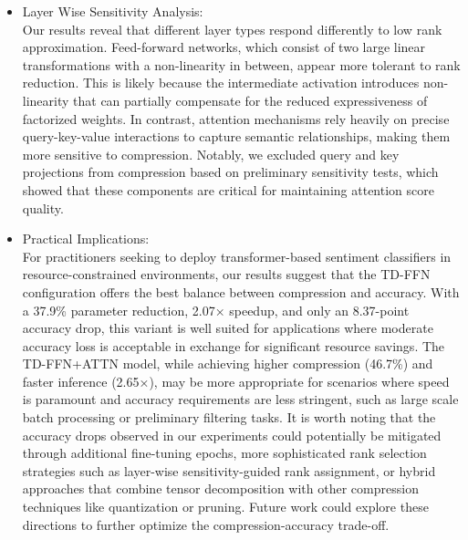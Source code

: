 \documentclass[conference]{IEEEtran}
\begin{document}
\begin{itemize}
            value and output projections, are more sensitive to rank reduction than feed-forward layers, which aligns with
            findings from prior work on transformer compression.
    \item Layer Wise Sensitivity Analysis:\\
            Our results reveal that different layer types respond differently to low rank approximation. Feed-forward networks,
            which consist of two large linear transformations with a non-linearity in between, appear more tolerant to rank
            reduction. This is likely because the intermediate activation introduces non-linearity that can partially compensate
            for the reduced expressiveness of factorized weights. In contrast, attention mechanisms rely heavily on precise
            query-key-value interactions to capture semantic relationships, making them more sensitive to compression.
            Notably, we excluded query and key projections from compression based on preliminary sensitivity tests, which
            showed that these components are critical for maintaining attention score quality.
    \item Practical Implications:\\
            For practitioners seeking to deploy transformer-based sentiment classifiers in resource-constrained environments,
            our results suggest that the TD-FFN configuration offers the best balance between compression and accuracy.
            With a 37.9\% parameter reduction, 2.07× speedup, and only an 8.37-point accuracy drop, this variant is well suited
            for applications where moderate accuracy loss is acceptable in exchange for significant resource savings.
            The TD-FFN+ATTN model, while achieving higher compression (46.7\%) and faster inference (2.65×), may be more
            appropriate for scenarios where speed is paramount and accuracy requirements are less stringent, such as large scale
            batch processing or preliminary filtering tasks. It is worth noting that the accuracy drops observed in our
            experiments could potentially be mitigated through additional fine-tuning epochs, more sophisticated rank
            selection strategies such as layer-wise sensitivity-guided rank assignment, or hybrid approaches that combine
            tensor decomposition with other compression techniques like quantization or pruning. Future work could explore
            these directions to further optimize the compression-accuracy trade-off.

\end{itemize}
\end{document}
